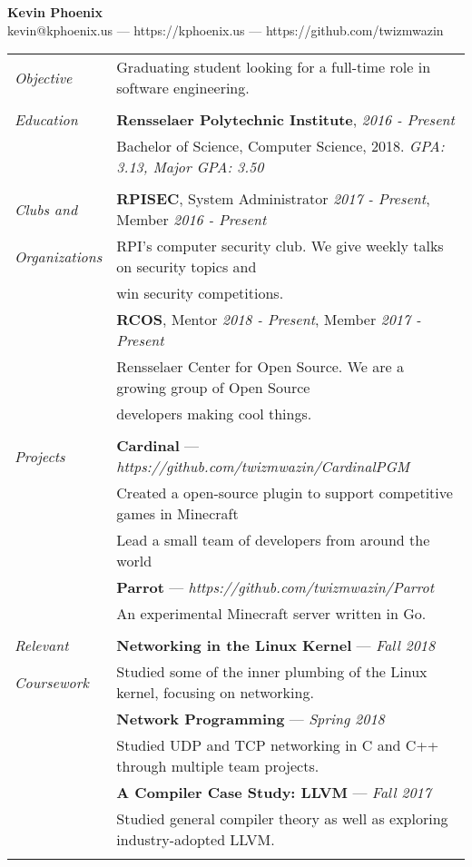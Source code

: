 \documentclass[letterpaper,10pt,oneside]{article}
\newcommand\entrytitle[1]{{\addfontfeature{LetterSpace=2}\textbf{#1}}}
\begin{document}
\begin{center}
    \Large{\textbf{Kevin Phoenix}} \normalsize \\
    \vspace{1mm}
    kevin@kphoenix.us --- https://kphoenix.us --- https://github.com/twizmwazin
\end{center}


\noindent
\begin{tabular}{@{} l l}

  \textit{Objective}
  & Graduating student looking for a full-time role in software engineering. \\
  & \\

  \textit{Education}
  & \entrytitle{Rensselaer Polytechnic Institute}, \textit{2016 - Present} \\
  & Bachelor of Science, Computer Science, 2018. \textit{GPA: 3.13, Major GPA: 3.50} \\
  & \\

  \textit{Clubs and}
  & \entrytitle{RPISEC}, System Administrator \textit{2017 - Present}, Member \textit{2016 - Present} \\
  \textit{Organizations}
  & RPI's computer security club. We give weekly talks on security topics and \\
  & win security competitions. \\
  & \entrytitle{RCOS}, Mentor \textit{2018 - Present}, Member \textit{2017 - Present} \\
  & Rensselaer Center for Open Source. We are a growing group of Open Source \\
  & developers making cool things. \\
  & \\

  \textit{Projects}
  & \entrytitle{Cardinal} --- \textit{https://github.com/twizmwazin/CardinalPGM} \\
  & Created a open-source plugin to support competitive games in Minecraft \\
  & Lead a small team of developers from around the world \\
  & \entrytitle{Parrot} --- \textit{https://github.com/twizmwazin/Parrot} \\
  & An experimental Minecraft server written in Go. \\
  & \\

  \textit{Relevant}
  & \entrytitle{Networking in the Linux Kernel} --- \textit{Fall 2018} \\
  \textit{Coursework}
  & Studied some of the inner plumbing of the Linux kernel, focusing on networking. \\
  & \entrytitle{Network Programming} --- \textit{Spring 2018} \\
  & Studied UDP and TCP networking in C and C++ through multiple team projects. \\
  & \entrytitle{A Compiler Case Study: LLVM} --- \textit{Fall 2017} \\
  & Studied general compiler theory as well as exploring industry-adopted LLVM. \\
  & \\


\end{tabular}
\end{document}

